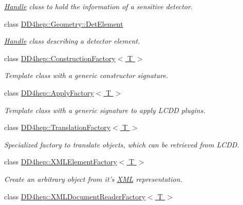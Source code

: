 \begin{DoxyCompactItemize}
\begin{DoxyCompactList}\small\item\em \hyperlink{class_d_d4hep_1_1_handle}{Handle} class to hold the information of a sensitive detector. \item\end{DoxyCompactList}\item 
class \hyperlink{class_d_d4hep_1_1_geometry_1_1_det_element}{DD4hep::Geometry::DetElement}
\begin{DoxyCompactList}\small\item\em \hyperlink{class_d_d4hep_1_1_handle}{Handle} class describing a detector element. \item\end{DoxyCompactList}\item 
class \hyperlink{class_d_d4hep_1_1_construction_factory}{DD4hep::ConstructionFactory$<$ T $>$}
\begin{DoxyCompactList}\small\item\em Template class with a generic constructor signature. \item\end{DoxyCompactList}\item 
class \hyperlink{class_d_d4hep_1_1_apply_factory}{DD4hep::ApplyFactory$<$ T $>$}
\begin{DoxyCompactList}\small\item\em Template class with a generic signature to apply LCDD plugins. \item\end{DoxyCompactList}\item 
class \hyperlink{class_d_d4hep_1_1_translation_factory}{DD4hep::TranslationFactory$<$ T $>$}
\begin{DoxyCompactList}\small\item\em Specialized factory to translate objects, which can be retrieved from LCDD. \item\end{DoxyCompactList}\item 
class \hyperlink{class_d_d4hep_1_1_x_m_l_element_factory}{DD4hep::XMLElementFactory$<$ T $>$}
\begin{DoxyCompactList}\small\item\em Create an arbitrary object from it's \hyperlink{namespace_d_d4hep_1_1_x_m_l}{XML} representation. \item\end{DoxyCompactList}\item 
class \hyperlink{class_d_d4hep_1_1_x_m_l_document_reader_factory}{DD4hep::XMLDocumentReaderFactory$<$ T $>$}

\end{DoxyCompactItemize}
